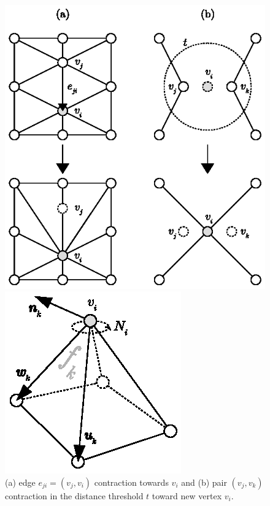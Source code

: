 \begin{figure}[h]
    \centering
    \begin{minipage}{0.49\textwidth}
        \centering
        \includegraphics[width=\textwidth]{figures/contraction_types.eps}
        \caption{(a) edge \(e_{ji} = (v_j, v_i)\) contraction towards \(v_i\)
                 and (b) pair \((v_j, v_k)\) contraction in the distance threshold \(t\) toward new vertex \(v_i\).}
        \label{fig:contractions}
    \end{minipage} \hfill
    \begin{minipage}{0.485\textwidth}
        \centering
        \includegraphics[width=\textwidth]{figures/quadric_planes.eps}

\end{minipage}
\end{figure}
